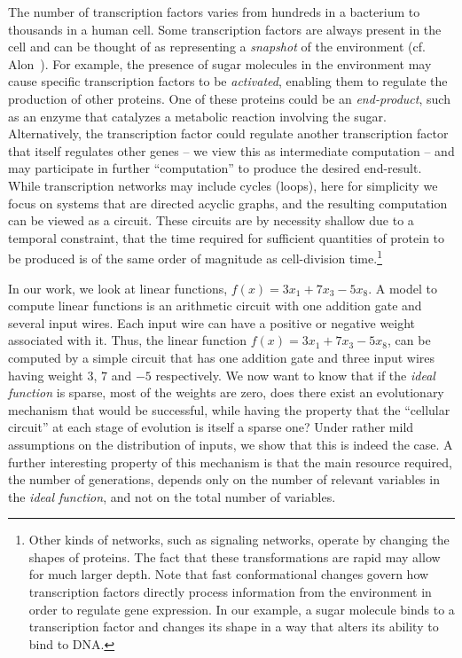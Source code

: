 \documentclass{acmtr2e}
\begin{document}
The number of transcription factors varies from hundreds in a bacterium to
thousands in a human cell. Some transcription factors are always present in the
cell and can be thought of as representing a \emph{snapshot} of the environment
(cf. Alon~\cite{Alon:2006}). For example, the presence of sugar molecules in the
environment may cause specific transcription factors to be \emph{activated},
enabling them to regulate the production of other proteins.  One of these
proteins could be an \emph{end-product}, such as an enzyme that catalyzes a
metabolic reaction involving the sugar. Alternatively, the transcription factor
could regulate another transcription factor that itself regulates other genes --
we view this as intermediate computation -- and may participate in further
``computation'' to produce the desired end-result.
%
While transcription networks may include cycles (loops), here for simplicity we
focus on systems that are directed acyclic graphs, and the resulting computation
can be viewed as a circuit. 
These circuits are by necessity shallow due to a temporal constraint, that the
time required for sufficient quantities of protein to be produced is of the same
order of magnitude as cell-division time.\footnote{Other kinds of networks, such
as signaling networks, operate by changing the shapes of proteins. The fact that
these transformations are rapid may allow for much larger depth. Note that fast
conformational changes govern how transcription factors directly process
information from the environment in order to regulate gene expression.  In our
example, a sugar molecule binds to a transcription factor and changes its shape
in a way that alters its ability to bind to DNA.} 
%

In our work, we look at linear functions, \eg $f(x) = 3x_1 + 7 x_3 - 5 x_8$.  A
model to compute linear functions is an arithmetic circuit with one addition
gate and several input wires. Each input wire can have a positive or negative weight
associated with it.  Thus, the linear function $f(x) = 3x_1 + 7 x_3 -5x_8$, can
be computed by a simple circuit that has one addition gate and three input wires
having weight $3$, $7$ and $-5$ respectively. We now want to know that if the
\emph{ideal function} is sparse, \ie most of the weights are zero, does there
exist an evolutionary mechanism that would be successful, while having the
property that the ``cellular circuit'' at each stage of evolution is itself a
sparse one? Under rather mild assumptions on the distribution of inputs, we show
that this is indeed the case. A further interesting property of this mechanism
is that the main resource required, the number of generations, depends only on
the number of relevant variables in the \emph{ideal function}, and not on the
total number of variables.
\end{document}
